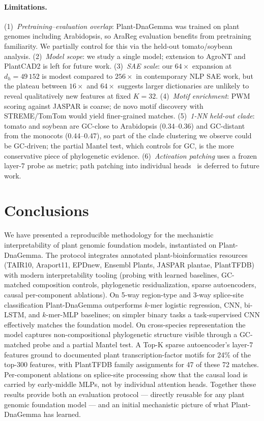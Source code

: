 \documentclass[11pt, a4paper]{article}
\begin{document}
\paragraph{Limitations.}
\label{sec:limitations}
(1)~\emph{Pretraining--evaluation overlap}: Plant-DnaGemma was trained on
plant genomes including Arabidopsis, so AraReg evaluation benefits from
pretraining familiarity. We partially control for this via the held-out
tomato/soybean analysis.
(2)~\emph{Model scope}: we study a single model; extension to AgroNT and
PlantCAD2 is left for future work.
(3)~\emph{SAE scale}: our $64\times$ expansion at $d_h = 49\,152$ is
modest compared to $256\times$ in contemporary NLP SAE work, but the
plateau between $16\times$ and $64\times$ suggests larger dictionaries
are unlikely to reveal qualitatively new features at fixed $K = 32$.
(4)~\emph{Motif enrichment}: PWM scoring against JASPAR is coarse; de
novo motif discovery with STREME/TomTom would yield finer-grained
matches.
(5)~\emph{1-NN held-out clade}: tomato and soybean are GC-close to
Arabidopsis (0.34--0.36) and GC-distant from the monocots (0.44--0.47),
so part of the clade clustering we observe could be GC-driven; the
partial Mantel test, which controls for GC, is the more conservative
piece of phylogenetic evidence.
(6)~\emph{Activation patching} uses a frozen layer-7 probe as metric;
path patching into individual heads~\citep{wang2023interpretability} is
deferred to future work.

\section*{Conclusions}
\label{sec:conclusions}

We have presented a reproducible methodology for the mechanistic
interpretability of plant genomic foundation models, instantiated on
Plant-DnaGemma. The protocol integrates annotated plant-bioinformatics
resources (TAIR10, Araport11, EPDnew, Ensembl Plants, JASPAR plantae,
PlantTFDB) with modern interpretability tooling (probing with learned
baselines, GC-matched composition controls, phylogenetic residualization,
sparse autoencoders, causal per-component ablations). On 5-way
region-type and 3-way splice-site classification Plant-DnaGemma
outperforms $k$-mer logistic regression, CNN, bi-LSTM, and $k$-mer-MLP
baselines; on simpler binary tasks a task-supervised CNN effectively
matches the foundation model. On cross-species representation the model
captures non-compositional phylogenetic structure visible through a
GC-matched probe and a partial Mantel test. A Top-K sparse autoencoder's
layer-7 features ground to documented plant transcription-factor motifs
for 24\% of the top-300 features, with PlantTFDB family assignments for
47 of these 72 matches. Per-component ablations on splice-site
processing show that the causal load is carried by early-middle MLPs,
not by individual attention heads. Together these results provide both
an evaluation protocol --- directly reusable for any plant genomic
foundation model --- and an initial mechanistic picture of what
Plant-DnaGemma has learned.
\end{document}
